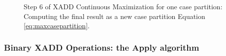 \documentclass[twoside,11pt]{article}
\begin{document}
\begin{figure}
 \centering
 \begin{minipage}{0.30\linewidth}
 \centering
 
 \end{minipage}
 \caption{Step 6 of XADD Continuous Maximization for one case partition: Computing the final result as a new case partition Equation \ref{eq:maxcasepartition}.}
 \label{fig:step6:xadd_max}
 \end{figure}



\subsubsection{Binary XADD Operations: the Apply algorithm}
\end{document}
